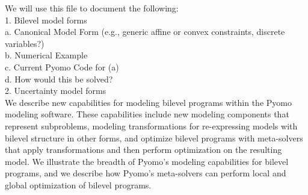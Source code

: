 We will use this file to document the following:\\
1. Bilevel model forms\\
\indent a. Canonical Model Form (e.g., generic affine or convex constraints, discrete variables?)\\
\indent b. Numerical Example\\
\indent c. Current Pyomo Code for (a)\\
\indent d. How would this be solved?\\
2. Uncertainty model forms\\

We describe new capabilities for modeling bilevel programs within
the Pyomo modeling software.  These capabilities include new modeling
components that represent subproblems, modeling transformations for
re-expressing models with bilevel structure in other forms, and
optimize bilevel programs with meta-solvers that apply transformations
and then perform optimization on the resulting model.  We illustrate
the breadth of Pyomo's modeling capabilities for bilevel programs,
and we describe how Pyomo's meta-solvers can perform local and
global optimization of bilevel programs.
\fi

